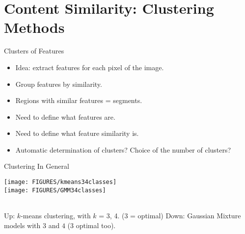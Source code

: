 \documentclass[9pt]{beamer}
\begin{document}
\section{Content Similarity: Clustering Methods}
\label{sec:clus}

\begin{frame}[t]{Clusters of Features}

  \begin{itemize}
  \item Idea: extract features for each pixel of the image.\vfill
  \item Group features by similarity.\vfill
  \item Regions with similar features = segments.\vfill
  \item Need to define what features are.\vfill
  \item Need to define what feature similarity is.\vfill
  \item Automatic determination of clusters? Choice of the number of clusters?
  \end{itemize}
\end{frame}


\begin{frame}[t]{Clustering In General}
  \begin{center}
    \texttt{[image: FIGURES/kmeans34classes]}\\
    \texttt{[image: FIGURES/GMM34classes]}\\
  \end{center}
  ~\\
  Up: $k$-means clustering, with $k$ = 3, 4. (3 = optimal)
  Down: Gaussian Mixture models with $3$ and  $4$ ($3$ optimal too).
\end{frame}
\end{document}
